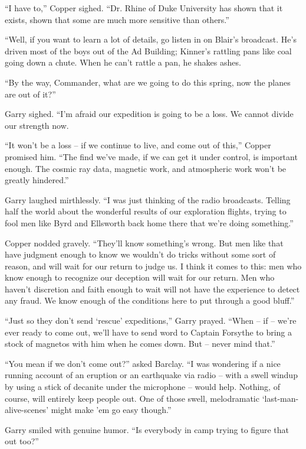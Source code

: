 \documentclass[letterpaper,openany,12pt]{memoir}		%
\begin{document}
``I have to,'' Copper sighed. ``Dr. Rhine of Duke University has shown that it
exists, shown that some are much more sensitive than others.''

``Well, if you want to learn a lot of details, go listen in on Blair's
broadcast. He's driven most of the boys out of the Ad Building; Kinner's
rattling pans like coal going down a chute. When he can't rattle a pan, he
shakes ashes.

``By the way, Commander, what are we going to do this spring, now the planes are
out of it?''

Garry sighed. ``I'm afraid our expedition is going to be a loss. We cannot
divide our strength now.

``It won't be a loss -- if we continue to live, and come out of this,'' Copper
promised him. ``The find we've made, if we can get it under control, is
important enough. The cosmic ray data, magnetic work, and atmospheric work won't
be greatly hindered.''

Garry laughed mirthlessly. ``I was just thinking of the radio broadcasts.
Telling half the world about the wonderful results of our exploration flights,
trying to fool men like Byrd and Ellsworth back home there that we're doing
something.''

Copper nodded gravely. ``They'll know something's wrong. But men like that have
judgment enough to know we wouldn't do tricks without some sort of reason, and
will wait for our return to judge us. I think it comes to this: men who know
enough to recognize our deception will wait for our return. Men who haven't
discretion and faith enough to wait will not have the experience to detect any
fraud. We know enough of the conditions here to put through a good bluff.''

``Just so they don't send `rescue' expeditions,'' Garry prayed. ``When -- if --
we're ever ready to come out, we'll have to send word to Captain Forsythe to
bring a stock of magnetos with him when he comes down. But -- never mind that.''

``You mean if we don't come out?'' asked Barclay. ``I was wondering if a nice
running account of an eruption or an earthquake via radio -- with a swell windup
by using a stick of decanite under the microphone -- would help. Nothing, of
course, will entirely keep people out. One of those swell, melodramatic
`last-man-alive-scenes' might make 'em go easy though.''

Garry smiled with genuine humor. ``Is everybody in camp trying to figure that
out too?''
\end{document}
